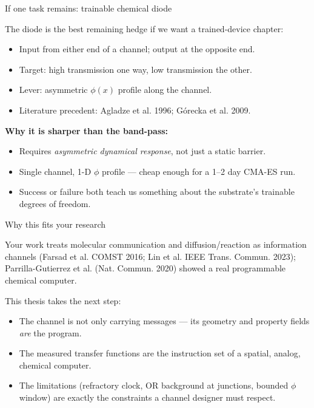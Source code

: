 \documentclass[aspectratio=169,11pt]{beamer}
\newcommand{\etal}{et al.}
\begin{document}
\begin{frame}{If one task remains: trainable chemical diode}

The diode is the best remaining hedge if we want a trained-device chapter:
\begin{itemize}
    \item Input from either end of a channel; output at the opposite end.
    \item Target: high transmission one way, low transmission the other.
    \item Lever: asymmetric $\phi(x)$ profile along the channel.
    \item Literature precedent: Agladze \etal{} 1996; G\'{o}recka \etal{} 2009.
\end{itemize}

\vspace{0.3cm}
\textbf{Why it is sharper than the band-pass:}
\begin{itemize}
    \item Requires \emph{asymmetric dynamical response}, not just a static barrier.
    \item Single channel, 1-D $\phi$ profile --- cheap enough for a 1--2 day CMA-ES run.
    \item Success or failure both teach us something about the substrate's trainable degrees of freedom.
\end{itemize}

\end{frame}

\begin{frame}{Why this fits your research}

Your work treats molecular communication and diffusion/reaction as information channels (Farsad \etal{} COMST 2016; Lin \etal{} IEEE Trans. Commun. 2023); Parrilla-Gutierrez \etal{} (Nat. Commun. 2020) showed a real programmable chemical computer.

\vspace{0.3cm}
This thesis takes the next step:
\begin{itemize}
    \item The channel is not only carrying messages --- its geometry and property fields \emph{are} the program.
    \item The measured transfer functions are the instruction set of a spatial, analog, chemical computer.
    \item The limitations (refractory clock, OR background at junctions, bounded $\phi$ window) are exactly the constraints a channel designer must respect.
\end{itemize}

\end{frame}
\end{document}
